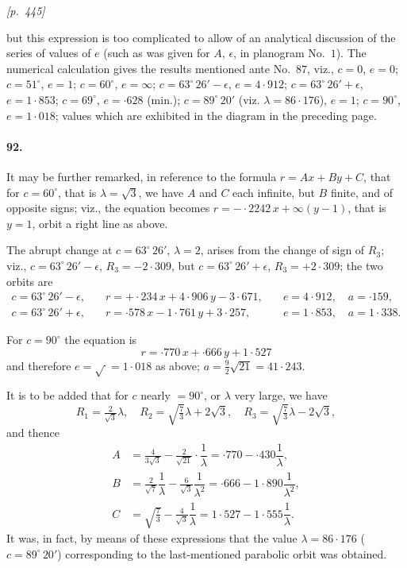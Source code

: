 \documentclass[11pt]{article}
\begin{document}
\medskip
\noindent\textit{[p.~445]}

\medskip

but this expression is too complicated to allow of an analytical discussion of the series of values of $e$ (such as was given for $A$, $\epsilon$, in planogram No.~$1$). The numerical calculation gives the results mentioned ante No.~$87$, viz., $c = 0$, $e = 0$; $c = 51^{\circ}$, $e = 1$; $c = 60^{\circ}$, $e = \infty$; $c = 63^{\circ}\,26' - \epsilon$, $e = 4{\cdot}912$; $c = 63^{\circ}\,26' + \epsilon$, $e = 1{\cdot}853$; $c = 69^{\circ}$, $e = {\cdot}628$ (min.); $c = 89^{\circ}\,20'$ (viz. $\lambda = 86{\cdot}176$), $e = 1$; $c = 90^{\circ}$, $e = 1{\cdot}018$; values which are exhibited in the diagram in the preceding page.

\paragraph{92.} It may be further remarked, in reference to the formula $r = Ax + By + C$, that for $c = 60^{\circ}$, that is $\lambda = \sqrt{3}$, we have $A$ and $C$ each infinite, but $B$ finite, and of opposite signs; viz., the equation becomes $r = -{\cdot}2242\,x + \infty(y - 1)$, that is $y = 1$, orbit a right line as above.

The abrupt change at $c = 63^{\circ}\,26'$, $\lambda = 2$, arises from the change of sign of $R_{3}$; viz., $c = 63^{\circ}\,26' - \epsilon$, $R_{3} = -2{\cdot}309$, but $c = 63^{\circ}\,26' + \epsilon$, $R_{3} = +2{\cdot}309$; the two orbits are
\[
\begin{aligned}
c = 63^{\circ}\,26' - \epsilon, &\quad r = +{\cdot}234\,x + 4{\cdot}906\,y - 3{\cdot}671, &\quad e = 4{\cdot}912,\quad a = {\cdot}159,\\
c = 63^{\circ}\,26' + \epsilon, &\quad r = {\cdot}578\,x - 1{\cdot}761\,y + 3{\cdot}257, &\quad e = 1{\cdot}853,\quad a = 1{\cdot}338.
\end{aligned}
\]

For $c = 90^{\circ}$ the equation is
\[
r = {\cdot}770\,x + {\cdot}666\,y + 1{\cdot}527
\]
and therefore $e = \sqrt{\tfrac{}{}} = 1{\cdot}018$ as above; $a = \tfrac{9}{2}\sqrt{21} = 41{\cdot}243$.

It is to be added that for $c$ nearly $= 90^{\circ}$, or $\lambda$ very large, we have
\[
R_{1} = \tfrac{2}{\sqrt{3}}\lambda,\quad R_{2} = \sqrt{\tfrac{7}{3}}\lambda + 2\sqrt{3},\quad R_{3} = \sqrt{\tfrac{7}{3}}\lambda - 2\sqrt{3},
\]
and thence
\[
\begin{aligned}
A &= \tfrac{4}{3\sqrt{3}} - \tfrac{2}{\sqrt{21}}\cdot\dfrac{1}{\lambda} = {\cdot}770 - {\cdot}430\dfrac{1}{\lambda},\\
B &= \tfrac{2}{\sqrt{7}}\dfrac{1}{\lambda} - \tfrac{6}{\sqrt{3}}\dfrac{1}{\lambda^{2}} = {\cdot}666 - 1{\cdot}890\dfrac{1}{\lambda^{2}},\\
C &= \sqrt{\tfrac{7}{3}} - \tfrac{4}{\sqrt{3}}\dfrac{1}{\lambda} = 1{\cdot}527 - 1{\cdot}555\dfrac{1}{\lambda}.
\end{aligned}
\]
It was, in fact, by means of these expressions that the value $\lambda = 86{\cdot}176$ ($c = 89^{\circ}\,20'$) corresponding to the last-mentioned parabolic orbit was obtained.
\end{document}
